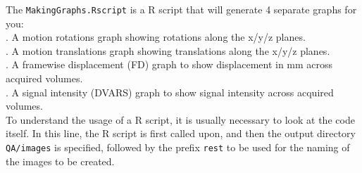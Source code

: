  The \texttt{MakingGraphs.Rscript} is a R script that will generate 4 separate graphs for you: \\
	. A motion rotations graph showing rotations along the x/y/z planes.\\
	. A motion translations graph showing translations along the x/y/z planes.\\
	. A framewise displacement (FD) graph to show displacement in mm across acquired volumes.\\
	. A signal intensity (DVARS) graph to show signal intensity across acquired volumes.\\
	To understand the usage of a R script, it is usually necessary to look at the code itself. In this line, the R script is first called upon, and then the output directory \texttt{QA/images} is specified, followed by the prefix \texttt{rest} to be used for the naming of the images to be created.\\

